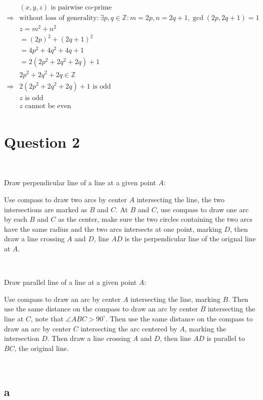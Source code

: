 \documentclass{article}
\begin{document}
~

\begin{align*}
    &(x,y,z)\text{ is pairwise co-prime}\\
    \Rightarrow&\text{without loss of generality}:\exists p,q\in\mathbb{Z}: m=2p,n=2q+1,\gcd(2p,2q+1)=1\\
    &z=m^2+n^2\\
    &=(2p)^2+(2q+1)^2\\
    &=4p^2+4q^2+4q+1\\
    &=2(2p^2+2q^2+2q)+1\\
    &2p^2+2q^2+2q\in\mathbb{Z}\\
    \Rightarrow&2(2p^2+2q^2+2q)+1\text{ is odd}\\
    &z\text{ is odd}\\
    &z\text{ cannot be even}\\
\end{align*}

\newpage

\section*{Question 2}

~

Draw perpendicular line of a line at a given point $A$:

Use compass to draw two arcs by center $A$ intersecting the line, the two intersections are marked as $B$ and $C$. At $B$ and $C$, use compass to draw one arc by each $B$ and $C$ as the center, make sure the two circles containing the two arcs have the same radius and the two arcs intersects at one point, marking $D$, then draw a line crossing $A$ and $D$, line $AD$ is the perpendicular line of the orignal line at $A$.

~

Draw parallel line of a line at a given point $A$:

Use compass to draw an arc by center $A$ intersecting the line, marking $B$. Then use the same distance on the compass to draw an arc by center $B$ intersecting the line at $C$, note that $\angle ABC >90^\circ$. Then use the same distance on the compass to draw an arc by center $C$ intersecting the arc centered by $A$, marking the intersection $D$. Then draw a line crossing $A$ and $D$, then line $AD$ is parallel to $BC$, the original line.

~

\subsection*{a}
\end{document}
